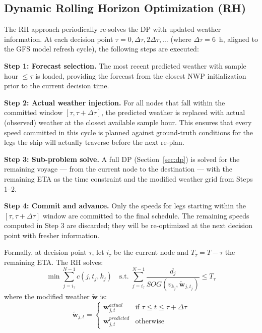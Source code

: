 \documentclass[review]{elsarticle}
\begin{document}
\subsection{Dynamic Rolling Horizon Optimization (RH)}
\label{sec:rh}

The RH approach periodically re-solves the DP with updated weather information. At each decision point $\tau = 0, \Delta\tau, 2\Delta\tau, \ldots$ (where $\Delta\tau = 6$~h, aligned to the GFS model refresh cycle), the following steps are executed:

\textbf{Step 1: Forecast selection.} The most recent predicted weather with sample hour $\leq \tau$ is loaded, providing the forecast from the closest NWP initialization prior to the current decision time.

\textbf{Step 2: Actual weather injection.} For all nodes that fall within the committed window $[\tau, \tau + \Delta\tau]$, the predicted weather is replaced with actual (observed) weather at the closest available sample hour. This ensures that every speed committed in this cycle is planned against ground-truth conditions for the legs the ship will actually traverse before the next re-plan.

\textbf{Step 3: Sub-problem solve.} A full DP (Section~\ref{sec:dp}) is solved for the remaining voyage --- from the current node to the destination --- with the remaining ETA as the time constraint and the modified weather grid from Steps 1--2.

\textbf{Step 4: Commit and advance.} Only the speeds for legs starting within the $[\tau, \tau + \Delta\tau]$ window are committed to the final schedule. The remaining speeds computed in Step 3 are discarded; they will be re-optimized at the next decision point with fresher information.

Formally, at decision point $\tau$, let $i_\tau$ be the current node and $T_\tau = T - \tau$ the remaining ETA. The RH solves:
\begin{equation}
    \min \sum_{j=i_\tau}^{N-1} c(j, t_j, k_j) \quad \text{s.t. } \sum_{j=i_\tau}^{N-1} \frac{d_j}{SOG(v_{k_j}, \tilde{\mathbf{w}}_{j,t_j})} \leq T_\tau
    \label{eq:rh-obj}
\end{equation}
where the modified weather $\tilde{\mathbf{w}}$ is:
\begin{equation}
    \tilde{\mathbf{w}}_{j,t} = \begin{cases}
    \mathbf{w}^{actual}_{j,t} & \text{if } \tau \leq t \leq \tau + \Delta\tau \\
    \mathbf{w}^{predicted}_{j,t} & \text{otherwise}
    \end{cases}
    \label{eq:rh-weather}
\end{equation}
\end{document}
